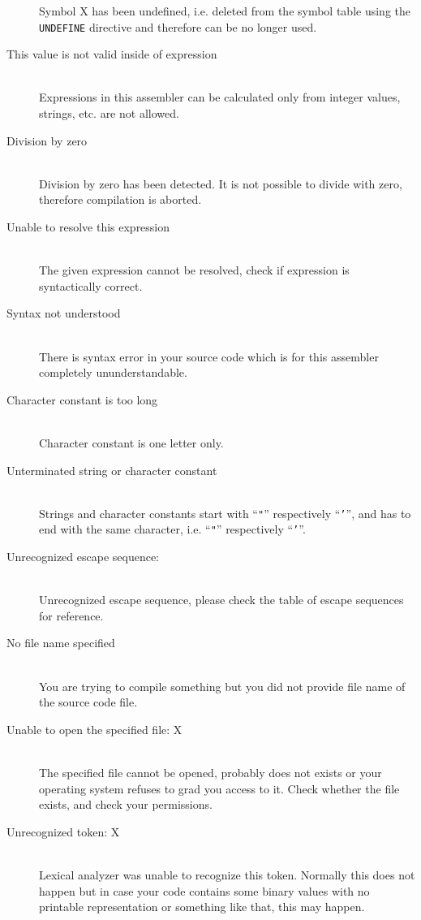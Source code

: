 \begin{description}
            Symbol X has been undefined, i.e. deleted from the symbol table using the \texttt{UNDEFINE} directive and therefore can be no longer used.
        \item[This value is not valid inside of expression ]~\\
            Expressions in this assembler can be calculated only from integer values, strings, etc. are not allowed.
        \item[Division by zero]~\\
            Division by zero has been detected. It is not possible to divide with zero, therefore compilation is aborted.
        \item[Unable to resolve this expression]~\\
            The given expression cannot be resolved, check if expression is syntactically correct.
        \item[Syntax not understood]~\\
            There is syntax error in your source code which is for this assembler completely ununderstandable.
        \item[Character constant is too long]~\\
            Character constant is one letter only.
        \item[Unterminated string or character constant]~\\
            Strings and character constants start with ``\texttt{"}'' respectively ``\texttt{'}'', and has to end with the same character, i.e. ``\texttt{"}'' respectively ``\texttt{'}''.
        \item[Unrecognized escape sequence:]~\\
            Unrecognized escape sequence, please check the table of escape sequences for reference.
        \item[No file name specified]~\\
            You are trying to compile something but you did not provide file name of the source code file.
        \item[Unable to open the specified file: X]~\\
            The specified file cannot be opened, probably does not exists or your operating system refuses to grad you access to it. Check whether the file exists, and check your permissions.
        \item[Unrecognized token: X]~\\
            Lexical analyzer was unable to recognize this token. Normally this does not happen but in case your code contains some binary values with no printable representation or something like that, this may happen.

\end{description}

